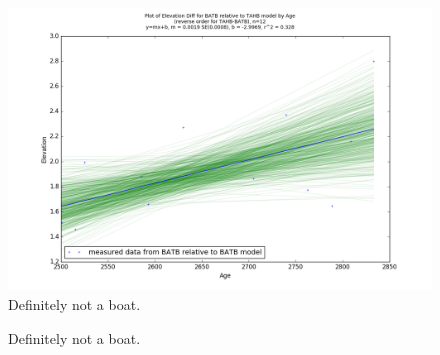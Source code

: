 \documentclass{article}
\begin{document}
\begin{figure}[h]
	\includegraphics[width=\linewidth]{data/gias/theGIA_BATB_relative_to_TAHB.png}
	\caption{Definitely not a boat.}
	\label{fig:gias_BATBxTAHB}
\end{figure}
\newpage








\begin{figure}[h]
	\caption{Definitely not a boat.}
	\label{fig:data_TAHBxBATB}
\end{figure}
\newpage
\end{document}
